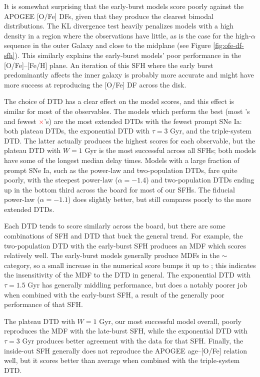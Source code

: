 \documentclass[twocolumn,twocolappendix]{aastex631}
\newcommand{\yes}{\textcolor{green}{\checkmark}\xspace}
\newcommand{\meh}{\textcolor{black}{$\sim$}\xspace}
\newcommand{\no}{\textcolor{red}{$\times$}\xspace}
\begin{document}
It is somewhat surprising that the early-burst models score poorly against the APOGEE [O/Fe] DFs, given that they produce the clearest bimodal distributions. The KL divergence test heavily penalizes models with a high density in a region where the observations have little, as is the case for the high-$\alpha$ sequence in the outer Galaxy and close to the midplane (see Figure \ref{fig:ofe-df-sfh}). This similarly explains the early-burst models' poor performance in the [O/Fe]--[Fe/H] plane. An iteration of this SFH where the early burst predominantly affects the inner galaxy is probably more accurate and might have more success at reproducing the [O/Fe] DF across the disk.

The choice of DTD has a clear effect on the model scores, and this effect is similar for most of the observables. The models which perform the best (most \yes's and fewest \no's) are the most extended DTDs with the fewest prompt SNe Ia: both plateau DTDs, the exponential DTD with $\tau=3$ Gyr, and the triple-system DTD. The latter actually produces the highest scores for each observable, but the plateau DTD with $W=1$ Gyr is the most successful across all SFHs; both models have some of the longest median delay times. Models with a large fraction of prompt SNe Ia, such as the power-law and two-population DTDs, fare quite poorly, with the steepest power-law ($\alpha=-1.4$) and two-population DTDs ending up in the bottom third across the board for most of our SFHs. The fiducial power-law ($\alpha=-1.1$) does slightly better, but still compares poorly to the more extended DTDs.

Each DTD tends to score similarly across the board, but there are some combinations of SFH and DTD that buck the general trend. For example, the two-population DTD with the early-burst SFH produces an MDF which scores relatively well. The early-burst models generally produce MDFs in the \meh category, so a small increase in the numerical score bumps it up to \yes; this indicates the insensitivity of the MDF to the DTD in general. The exponential DTD with $\tau=1.5$ Gyr has generally middling performance, but does a notably poorer job when combined with the early-burst SFH, a result of the generally poor performance of that SFH. 

The plateau DTD with $W=1$ Gyr, our most successful model overall, poorly reproduces the MDF with the late-burst SFH, while the exponential DTD with $\tau=3$ Gyr produces better agreement with the data for that SFH. Finally, the inside-out SFH generally does not reproduce the APOGEE age--[O/Fe] relation well, but it scores better than average when combined with the triple-system DTD.
\end{document}
